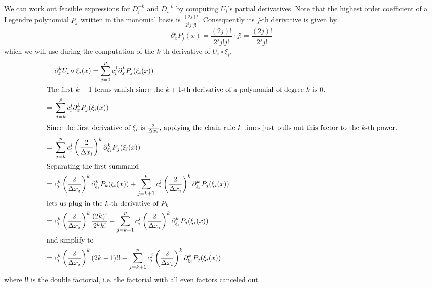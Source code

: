 We can work out feasible expressions for $D_{i}^{+k}$ and $D_{i}^{-k}$ by computing $U_{i}$'s partial derivatives.
Note that the highest order coefficient of a Legendre polynomial $P_{j}$ written in the monomial basis is $\frac{(2j)!}{2^{j} j! j!}$.
Consequently its $j$-th derivative is given by
\begin{equation*}
  \partial_{x}^{j} P_{j}(x) = \frac{(2j)!}{2^{j} j! j!} \cdot j! = \frac{(2j)!}{2^{j} j!}
\end{equation*}
which we will use during the computation of the $k$-th derivative of $U_{i} \circ \xi_{i}$.
\begin{align}
  & \partial_{x}^{k} U_{i} \circ \xi_{i}(x) = \sum_{j = 0}^{p} c_{i}^{j} \partial_{x}^{k} P_{j}(\xi_{i}(x))\nonumber\\
  \intertext{The first $k - 1$ terms vanish since the $k + 1$-th derivative of a polynomial of degree $k$ is $0$.}
  =~& \sum_{j = k}^{p} c_{i}^{j} \partial_{x}^{k} P_{j}(\xi_{i}(x))\nonumber\\
  \intertext{Since the first derivative of $\xi_{i}$ is $\frac{2}{\Delta x_{i}}$, applying the chain rule $k$ times just pulls out this factor to the $k$-th power.}
  =~& \sum_{j = k}^{p} c_{i}^{j} \left( \frac{2}{\Delta x_{i}} \right)^{k} \partial_{\xi_{i}}^{k} P_{j}(\xi_{i}(x))\nonumber\\
  \intertext{Separating the first summand}
  =~& c_{i}^{k} \left( \frac{2}{\Delta x_{i}} \right)^{k} \partial_{\xi_{i}}^{k} P_{k}(\xi_{i}(x)) + \sum_{j = k + 1}^{p} c_{i}^{j} \left( \frac{2}{\Delta x_{i}} \right)^{k} \partial_{\xi_{i}}^{k} P_{j}(\xi_{i}(x))\nonumber\\
  \intertext{lets us plug in the $k$-th derivative of $P_{k}$}
  =~& c_{i}^{k} \left( \frac{2}{\Delta x_{i}} \right)^{k} \frac{(2k)!}{2^{k} k!} + \sum_{j = k + 1}^{p} c_{i}^{j} \left( \frac{2}{\Delta x_{i}} \right)^{k} \partial_{\xi_{i}}^{k} P_{j}(\xi_{i}(x))\nonumber\\
  \intertext{and simplify to}
  =~& c_{i}^{k} \left( \frac{2}{\Delta x_{i}} \right)^{k} \left( 2k - 1 \right)!! + \sum_{j = k + 1}^{p} c_{i}^{j} \left( \frac{2}{\Delta x_{i}} \right)^{k} \partial_{\xi_{i}}^{k} P_{j}(\xi_{i}(x)) \label{eq:kth-deriv}
\end{align}
where $!!$ is the double factorial, i.e. the factorial with all even factors canceled out.

